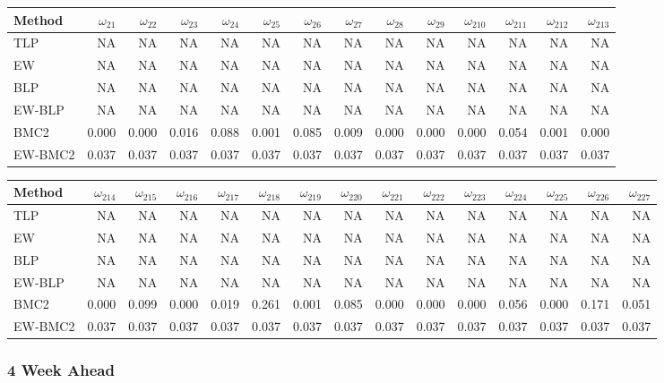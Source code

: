 \documentclass[
]{article}
\begin{document}
\begin{tabular}{lrrrrrrrrrrrrr}
\toprule
Method & $\omega_{21}$ & $\omega_{22}$ & $\omega_{23}$ & $\omega_{24}$ & $\omega_{25}$ & $\omega_{26}$ & $\omega_{27}$ & $\omega_{28}$ & $\omega_{29}$ & $\omega_{210}$ & $\omega_{211}$ & $\omega_{212}$ & $\omega_{213}$\\
\midrule
TLP & NA & NA & NA & NA & NA & NA & NA & NA & NA & NA & NA & NA & NA\\
EW & NA & NA & NA & NA & NA & NA & NA & NA & NA & NA & NA & NA & NA\\
BLP & NA & NA & NA & NA & NA & NA & NA & NA & NA & NA & NA & NA & NA\\
EW-BLP & NA & NA & NA & NA & NA & NA & NA & NA & NA & NA & NA & NA & NA\\
BMC2 & 0.000 & 0.000 & 0.016 & 0.088 & 0.001 & 0.085 & 0.009 & 0.000 & 0.000 & 0.000 & 0.054 & 0.001 & 0.000\\
EW-BMC2 & 0.037 & 0.037 & 0.037 & 0.037 & 0.037 & 0.037 & 0.037 & 0.037 & 0.037 & 0.037 & 0.037 & 0.037 & 0.037\\
\bottomrule
\end{tabular}

\begin{tabular}{lrrrrrrrrrrrrrr}
\toprule
Method & $\omega_{214}$ & $\omega_{215}$ & $\omega_{216}$ & $\omega_{217}$ & $\omega_{218}$ & $\omega_{219}$ & $\omega_{220}$ & $\omega_{221}$ & $\omega_{222}$ & $\omega_{223}$ & $\omega_{224}$ & $\omega_{225}$ & $\omega_{226}$ & $\omega_{227}$\\
\midrule
TLP & NA & NA & NA & NA & NA & NA & NA & NA & NA & NA & NA & NA & NA & NA\\
EW & NA & NA & NA & NA & NA & NA & NA & NA & NA & NA & NA & NA & NA & NA\\
BLP & NA & NA & NA & NA & NA & NA & NA & NA & NA & NA & NA & NA & NA & NA\\
EW-BLP & NA & NA & NA & NA & NA & NA & NA & NA & NA & NA & NA & NA & NA & NA\\
BMC2 & 0.000 & 0.099 & 0.000 & 0.019 & 0.261 & 0.001 & 0.085 & 0.000 & 0.000 & 0.000 & 0.056 & 0.000 & 0.171 & 0.051\\
EW-BMC2 & 0.037 & 0.037 & 0.037 & 0.037 & 0.037 & 0.037 & 0.037 & 0.037 & 0.037 & 0.037 & 0.037 & 0.037 & 0.037 & 0.037\\
\bottomrule
\end{tabular}

\hypertarget{week-ahead-19}{%
\subsubsection{4 Week Ahead}\label{week-ahead-19}}
\end{document}

